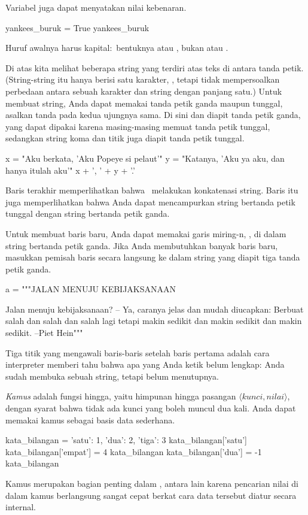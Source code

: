 Variabel juga dapat menyatakan nilai kebenaran.
\begin{pythonconsole}
yankees_buruk = True
yankees_buruk
\end{pythonconsole}
Huruf awalnya harus kapital:~bentuknya
atau , bukan
atau .
 
Di atas kita melihat beberapa string yang terdiri atas teks di antara tanda petik.
(String-string itu hanya berisi satu karakter, ,
tetapi \python{} tidak mempersoalkan perbedaan antara sebuah karakter
dan string dengan panjang satu.)
Untuk membuat string, Anda dapat memakai tanda petik ganda maupun tunggal, asalkan
tanda pada kedua ujungnya sama. 
Di sini  dan 
diapit tanda petik ganda, yang dapat dipakai karena masing-masing memuat
tanda petik tunggal, sedangkan string koma dan titik juga diapit tanda petik tunggal. 
\begin{pythonconsole}
x = "Aku berkata, 'Aku Popeye si pelaut'"
y = "Katanya, 'Aku ya aku, dan hanya itulah aku'"
x + ', ' + y + '.'
\end{pythonconsole}
Baris terakhir memperlihatkan bahwa~\inlinecode{+} 
melakukan konkatenasi string.
Baris itu juga memperlihatkan bahwa Anda dapat mencampurkan string bertanda petik tunggal
dengan string bertanda petik ganda.

Untuk membuat baris baru, Anda dapat memakai garis miring-n, \inlinecode{\\n}, 
di dalam string bertanda petik ganda.
Jika Anda membutuhkan banyak baris baru,
masukkan pemisah baris secara langsung ke dalam string yang diapit tiga tanda petik ganda.
\begin{pythonconsole}
a = """JALAN MENUJU KEBIJAKSANAAN
 
Jalan menuju kebijaksanaan?
-- Ya, caranya jelas
dan mudah diucapkan:
Berbuat salah
dan salah
dan salah lagi
tetapi makin sedikit
dan makin sedikit
dan makin sedikit. --Piet Hein"""
\end{pythonconsole} 
Tiga titik yang mengawali baris-baris setelah baris pertama
adalah cara interpreter
\python{} memberi tahu bahwa apa yang Anda ketik belum lengkap:
Anda sudah membuka sebuah string, tetapi belum menutupnya.

\textit{Kamus} \python{} adalah fungsi hingga,
yaitu himpunan hingga
pasangan $\langle\textit{kunci},\textit{nilai}\rangle$,
dengan syarat bahwa tidak ada kunci yang boleh muncul dua kali.
Anda dapat memakai kamus sebagai basis data sederhana.
\begin{pythonconsole}
kata_bilangan = {'satu': 1, 'dua': 2, 'tiga': 3}
kata_bilangan['satu']
kata_bilangan['empat'] = 4  
kata_bilangan
kata_bilangan['dua'] = -1
kata_bilangan
\end{pythonconsole} 
Kamus merupakan bagian penting dalam \python{}, antara lain karena pencarian nilai 
di dalam kamus berlangsung sangat cepat berkat cara data tersebut 
diatur secara internal.

